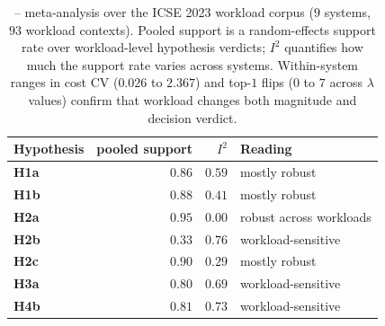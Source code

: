 \begin{table}[t]
\centering
\caption{\dsWLI -- meta-analysis over the ICSE 2023
workload corpus ($9$ systems, $93$ workload contexts). Pooled support
is a random-effects support rate over workload-level hypothesis
verdicts; $I^2$ quantifies how much the support rate varies across
systems. Within-system ranges in cost CV ($0.026$ to $2.367$) and
top-$1$ flips ($0$ to $7$ across $\lambda$ values) confirm that
workload changes both magnitude and decision verdict.}
\label{tab:workload-impact-meta}
\footnotesize
\setlength{\tabcolsep}{4.5pt}
\begin{tabular}{l r r l}
\toprule
Hypothesis & pooled support & $I^2$ & Reading \\
\midrule
\textbf{H1a} & $0.86$ & $0.59$ & mostly robust \\
\textbf{H1b} & $0.88$ & $0.41$ & mostly robust \\
\textbf{H2a} & $\mathbf{0.95}$ & $\mathbf{0.00}$ & robust across workloads \\
\textbf{H2b} & $0.33$ & $0.76$ & workload-sensitive \\
\textbf{H2c} & $0.90$ & $0.29$ & mostly robust \\
\textbf{H3a} & $0.80$ & $0.69$ & workload-sensitive \\
\textbf{H4b} & $0.81$ & $0.73$ & workload-sensitive \\
\bottomrule
\end{tabular}
\end{table}

